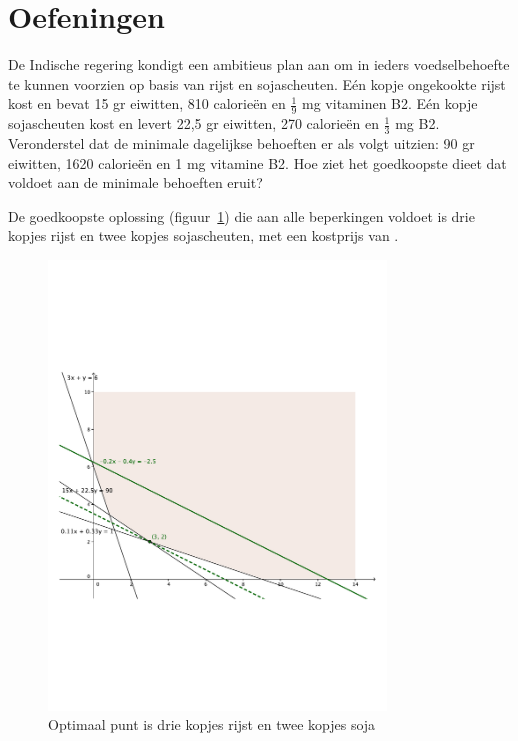 \section{Oefeningen}
\begin{oef}
De Indische regering kondigt een ambitieus plan aan om in
     ieders voedselbehoefte te kunnen voorzien op basis van rijst en
     sojascheuten. E\'{e}n kopje ongekookte rijst kost  en bevat
     15 gr eiwitten, 810 calorie\"{e}n en $\frac{1}{9}$ mg vitaminen
     B2. E\'{e}n kopje sojascheuten kost  en
     levert 22,5 gr eiwitten, 270 calorie\"{e}n en $\frac{1}{3}$ mg
     B2. Veronderstel dat de minimale dagelijkse
     behoeften er als volgt uitzien: 90 gr eiwitten, 1620 calorie\"{e}n
     en 1 mg vitamine B2.
 Hoe ziet het goedkoopste
     dieet dat voldoet aan de minimale behoeften eruit?
     \begin{opl}
     De goedkoopste oplossing (figuur~\ref{fig:oplrijstsoja}) die aan alle beperkingen voldoet is drie kopjes rijst en twee kopjes sojascheuten, met een kostprijs van . 
     \begin{figure}[hbtp]
\centering
\includegraphics[width=0.8\textwidth]{oefeningen/FigurenLP/OefRijstSoja.pdf}
\caption{Optimaal punt is drie kopjes rijst en twee kopjes soja}
\label{fig:oplrijstsoja}
\end{figure}

     \end{opl}
\end{oef}
 
